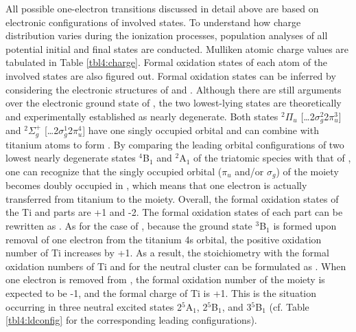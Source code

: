 \begin{refsection}
All possible one-electron transitions discussed in detail above are based on electronic configurations of involved states. To understand how charge distribution varies during the ionization processes, population analyses of all potential initial and final states are conducted. Mulliken atomic charge values are tabulated in Table \ref{tbl4:charge}. Formal oxidation states of each atom of the involved states are also figured out. Formal oxidation states can be inferred by considering the electronic structures of  and . Although there are still arguments over the electronic ground state of , the two lowest-lying states are theoretically and experimentally established as nearly degenerate. \cite{c4:39, c4:40, c4:41, c4:42, c4:43} Both states $^2\Pi_u$ [\ldots2$\sigma_g^2$2$\pi_u^3$] and $^2\Sigma_g^+$ [\ldots2$\sigma_g^1$2$\pi_u^4$] have one singly occupied orbital and can combine with titanium atoms to form . By comparing the leading orbital configurations of two lowest nearly degenerate states $^4$B$_1$ and $^2$A$_1$ of the triatomic species with that of , one can recognize that the singly occupied orbital ($\pi_u$ and/or $\sigma_g$) of the  moiety becomes  doubly occupied in , which means that one electron is actually transferred from titanium to the  moiety. Overall, the formal oxidation states of the Ti and  parts are +1 and -2. The formal oxidation states of each part can be rewritten as . As for the case of , because the ground state $^3$B$_1$ is formed upon removal of one electron from the titanium 4s orbital, the positive oxidation number of Ti increases by +1. As a result, the stoichiometry with the formal oxidation numbers of Ti and  for the neutral cluster can be formulated as . When one electron is removed from , the formal oxidation number of the  moiety is expected to be -1, and the formal charge of Ti is +1. This is the situation occurring in three neutral excited states 2$^5$A$_1$, 2$^5$B$_1$, and 3$^5$B$_1$ (cf. Table \ref{tbl4:ldconfig} for the corresponding leading configurations). 






\end{refsection}
